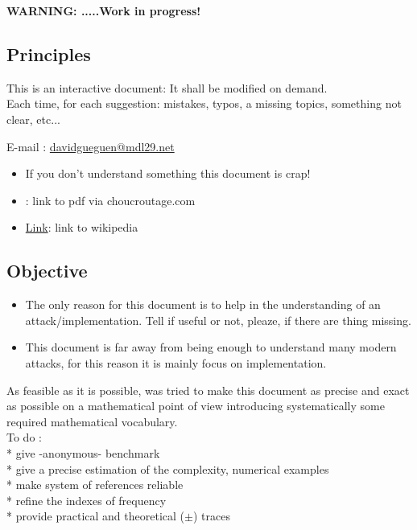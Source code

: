 	\begin{center}
		\Huge{\textbf{WARNING: .....Work in progress!}}
	\end{center}
\large
\label{Objective}
	
\subsection*{Principles}
This is an interactive document: It shall be modified on demand. \\
Each time, for each suggestion: mistakes, typos, a missing topics, something not clear, etc... 
\begin{center}
	E-mail \Letter: 
	\href{mailto:davidgueguen2000@yahoo.fr}{davidgueguen@mdl29.net}				
\end{center}
\begin{itemize}
	\item If you don't understand something this document is crap!	
	\item {}: link to pdf via choucroutage.com 
	\item \href{http://en.wikipedia.org}{Link}: link to wikipedia 
\end{itemize}

\subsection*{Objective}

\begin{itemize}	
\item The only reason for this document is to help in the understanding of an
	 attack/implementation. Tell if useful or not, pleaze, if there are thing missing.
	 
\item This document is far away from being enough to understand many modern attacks,
	for this reason it is mainly focus on implementation.	
\end{itemize}
As feasible as it is possible, was tried to make this document as precise and exact as possible 
on a mathematical point of view introducing systematically some required mathematical vocabulary. \\

To do :\\
*  give -anonymous- benchmark\\
*  give a precise estimation of the complexity, numerical examples\\
*  make system of references reliable  \\
*  refine the indexes of frequency\\
*  provide practical and theoretical ($\pm$) traces 

